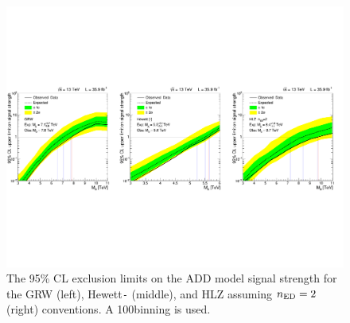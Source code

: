 \begin{figure}[pt]
	\centering
	\includegraphics[width=1.0\textwidth]{figures/Multi_Limits.pdf}
	\caption{The 95\% CL exclusion limits on the ADD model signal strength for the GRW (left), Hewett\texttt{-} (middle), and HLZ assuming $n_{\rm ED}=2$ (right) conventions. A 100\GeV binning is used.}
	\label{fig:ADD_limits}
\end{figure}

\begin{table}[pt]
	\centering
	\caption{Exclusion limits on the mass scale \Ms (in units of {\TeVns}) for various conventions used to calculate the ADD large extra-dimensional scenario. The total asymmetric uncertainties are shown on the expected limits.}
	\label{tab:ADD_limits}
\end{table}

